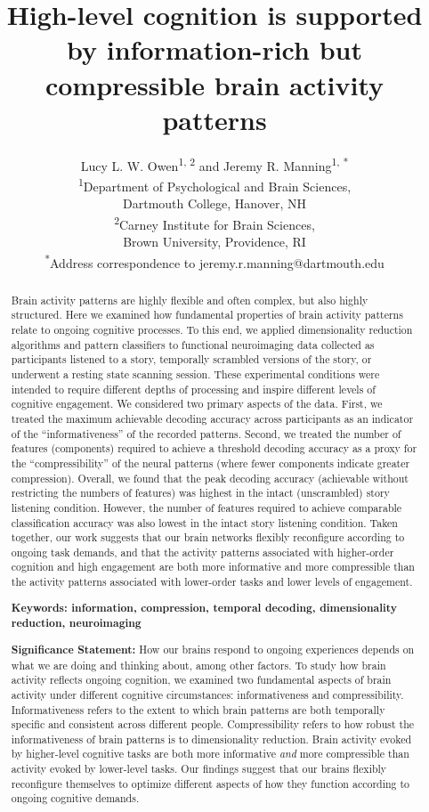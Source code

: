 \documentclass[english, 11pt]{article}
\title{High-level cognition is supported by information-rich but compressible brain activity patterns}
\author{Lucy L. W. Owen\textsuperscript{1, 2} and Jeremy R. Manning\textsuperscript{1,
*}\\\textsuperscript{1}Department of Psychological and Brain Sciences,\\Dartmouth College,
Hanover, NH\\[0.1cm]\textsuperscript{2}Carney Institute for Brain Sciences,\\Brown University,
Providence, RI\\[0.1cm] \textsuperscript{*}Address correspondence to
jeremy.r.manning@dartmouth.edu}
\begin{document}
\maketitle


\begin{abstract} 
  
Brain activity patterns are highly flexible and often complex, but also highly
structured. Here we examined how fundamental properties of brain activity
patterns relate to ongoing cognitive processes. To this end, we applied
dimensionality reduction algorithms and pattern classifiers to functional
neuroimaging data collected as participants listened to a story, temporally
scrambled versions of the story, or underwent a resting state scanning session.
These experimental conditions were intended to require different depths of
processing and inspire different levels of cognitive engagement. We considered
two primary aspects of the data. First, we treated the maximum achievable
decoding accuracy across participants as an indicator of the
``informativeness'' of the recorded patterns. Second, we treated the number of
features (components) required to achieve a threshold decoding accuracy as a
proxy for the ``compressibility'' of the neural patterns (where fewer
components indicate greater compression). Overall, we found that the peak
decoding accuracy (achievable without restricting the numbers of features) was
highest in the intact (unscrambled) story listening condition. However, the
number of features required to achieve comparable classification accuracy was
also lowest in the intact story listening condition. Taken together, our work
suggests that our brain networks flexibly reconfigure according to ongoing task
demands, and that the activity patterns associated with higher-order cognition
and high engagement are both more informative and more compressible than the
activity patterns associated with lower-order tasks and lower levels of
engagement.

\bigskip
\noindent
\textbf{Keywords: information, compression, temporal decoding, dimensionality
reduction, neuroimaging}

\bigskip 
\noindent 

\textbf{Significance Statement:} How our brains respond to ongoing
experiences depends on what we are doing and thinking about, among
other factors. To study how brain activity reflects ongoing cognition,
we examined two fundamental aspects of brain activity under different
cognitive circumstances: informativeness and
compressibility. Informativeness refers to the extent to which brain
patterns are both temporally specific and consistent across different
people. Compressibility refers to how robust the informativeness of
brain patterns is to dimensionality reduction. Brain activity evoked
by higher-level cognitive tasks are both more informative \textit{and} more
compressible than activity evoked by lower-level tasks. Our findings
suggest that our brains flexibly reconfigure themselves to optimize
different aspects of how they function according to ongoing cognitive
demands.

\end{abstract}
\end{document}
